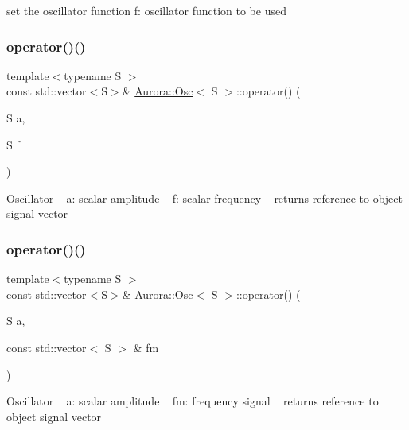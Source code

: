 set the oscillator function f\+: oscillator function to be used \mbox{\label{class_aurora_1_1_osc_a2a36c0afda86b6fabad4ed3ca0f510af}} 
\subsubsection{\texorpdfstring{operator()()}{operator()()}\hspace{0.1cm}{\footnotesize\ttfamily [1/4]}}
{\footnotesize\ttfamily template$<$typename S $>$ \\
const std\+::vector$<$S$>$\& \hyperlink{class_aurora_1_1_osc}{Aurora\+::\+Osc}$<$ S $>$\+::operator() (\begin{DoxyParamCaption}\item[{S}]{a,  }\item[{S}]{f }\end{DoxyParamCaption})\hspace{0.3cm}{\ttfamily [inline]}}

Oscillator ~\newline
a\+: scalar amplitude ~\newline
f\+: scalar frequency ~\newline
returns reference to object signal vector \mbox{\label{class_aurora_1_1_osc_af48611ef63363221de325d8976a1ec56}} 
\subsubsection{\texorpdfstring{operator()()}{operator()()}\hspace{0.1cm}{\footnotesize\ttfamily [2/4]}}
{\footnotesize\ttfamily template$<$typename S $>$ \\
const std\+::vector$<$S$>$\& \hyperlink{class_aurora_1_1_osc}{Aurora\+::\+Osc}$<$ S $>$\+::operator() (\begin{DoxyParamCaption}\item[{S}]{a,  }\item[{const std\+::vector$<$ S $>$ \&}]{fm }\end{DoxyParamCaption})\hspace{0.3cm}{\ttfamily [inline]}}

Oscillator ~\newline
a\+: scalar amplitude ~\newline
fm\+: frequency signal ~\newline
returns reference to object signal vector \mbox{\label{class_aurora_1_1_osc_a28fe97e5634b8a02474657ed456c326b}} 
